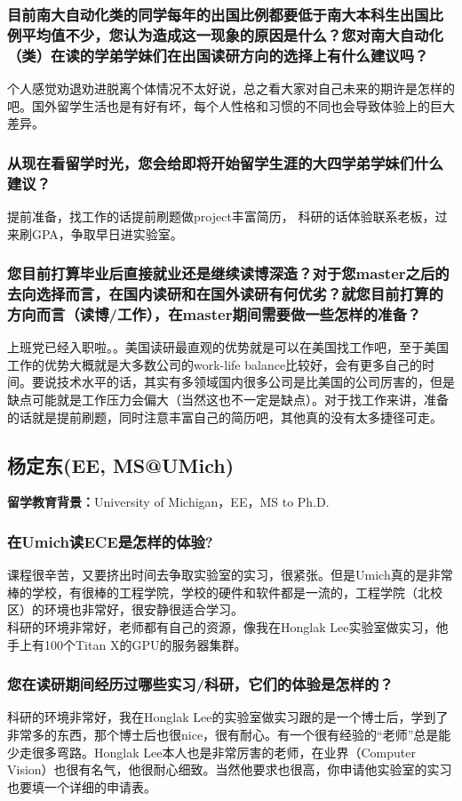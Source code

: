 \documentclass[a4paper,UTF8]{book}
\begin{document}
    \subsubsection*{目前南大自动化类的同学每年的出国比例都要低于南大本科生出国比例平均值不少，您认为造成这一现象的原因是什么？您对南大自动化（类）在读的学弟学妹们在出国读研方向的选择上有什么建议吗？}
    个人感觉劝退劝进脱离个体情况不太好说，总之看大家对自己未来的期许是怎样的吧。国外留学生活也是有好有坏，每个人性格和习惯的不同也会导致体验上的巨大差异。

    \subsubsection*{从现在看留学时光，您会给即将开始留学生涯的大四学弟学妹们什么建议？}
    提前准备，找工作的话提前刷题做project丰富简历， 科研的话体验联系老板，过来刷GPA，争取早日进实验室。

    \subsubsection*{您目前打算毕业后直接就业还是继续读博深造？对于您master之后的去向选择而言，在国内读研和在国外读研有何优劣？就您目前打算的方向而言（读博/工作），在master期间需要做一些怎样的准备？}
    上班党已经入职啦。。美国读研最直观的优势就是可以在美国找工作吧，至于美国工作的优势大概就是大多数公司的work-life balance比较好，会有更多自己的时间。要说技术水平的话，其实有多领域国内很多公司是比美国的公司厉害的，但是缺点可能就是工作压力会偏大（当然这也不一定是缺点）。对于找工作来讲，准备的话就是提前刷题，同时注意丰富自己的简历吧，其他真的没有太多捷径可走。


\clearpage
\subsection{杨定东(EE, MS@UMich)}
    \textbf{留学教育背景：}University of Michigan，EE，MS to Ph.D.

    \subsubsection*{在Umich读ECE是怎样的体验?}
    课程很辛苦，又要挤出时间去争取实验室的实习，很紧张。但是Umich真的是非常棒的学校，有很棒的工程学院，学校的硬件和软件都是一流的，工程学院（北校区）的环境也非常好，很安静很适合学习。\\
    科研的环境非常好，老师都有自己的资源，像我在Honglak Lee实验室做实习，他手上有100个Titan X的GPU的服务器集群。
    \subsubsection*{您在读研期间经历过哪些实习/科研，它们的体验是怎样的？}
    科研的环境非常好，我在Honglak Lee的实验室做实习跟的是一个博士后，学到了非常多的东西，那个博士后也很nice，很有耐心。有一个很有经验的“老师”总是能少走很多弯路。Honglak Lee本人也是非常厉害的老师，在业界（Computer Vision）也很有名气，他很耐心细致。当然他要求也很高，你申请他实验室的实习也要填一个详细的申请表。
\end{document}
